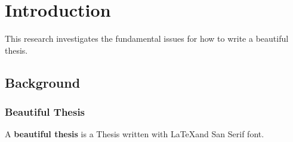 \chapter{Introduction}
\label{chap:intro}

This research investigates the fundamental issues for how to write a beautiful thesis.

\section{Background}
\label{sec:intro_background}

\subsection{Beautiful Thesis}
\label{sec:intro_bt}

A \textbf{beautiful thesis} \cite{6083078} is a Thesis written with \LaTeX and San Serif font.




